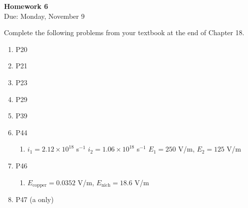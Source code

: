 \documentclass{article}
\begin{document}
\fancyfoot[C]{\thepage}
\vspace*{0cm}
\begin{center}
	{\LARGE \textbf{Homework 6}}\\
	\vspace{0.25cm}
	{\Large Due: Monday, November 9}
\end{center}

Complete the following problems from your textbook at the end of Chapter 18.
\begin{enumerate}
\item P20
\item P21
\item P23
\item P29
\item P39
\item P44
	\begin{enumerate}
		\item $i_1=2.12\times10^{18}$ s$^{-1}$ $i_2=1.06\times10^{18}$ s$^{-1}$ $E_1=250$ V/m, $E_2=125$ V/m
	\end{enumerate}
\item P46
	\begin{enumerate}
		\item $E_\mathrm{copper}=0.0352$ V/m, $E_\mathrm{nich}=18.6$ V/m
	\end{enumerate}
\item P47 (a only)
\end{enumerate}
\end{document}
